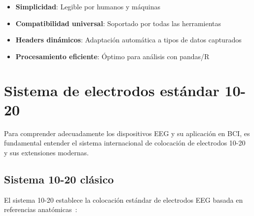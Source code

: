 \begin{itemize}
    \item \textbf{Simplicidad}: Legible por humanos y máquinas
    \item \textbf{Compatibilidad universal}: Soportado por todas las herramientas
    \item \textbf{Headers dinámicos}: Adaptación automática a tipos de datos capturados
    \item \textbf{Procesamiento eficiente}: Óptimo para análisis con pandas/R
\end{itemize}

\section{Sistema de electrodos estándar 10-20}
\label{sec:sistema_electrodos}

Para comprender adecuadamente los dispositivos EEG y su aplicación en BCI, es fundamental entender el sistema internacional de colocación de electrodos 10-20~\cite{system_10_20} y sus extensiones modernas.

\subsection{Sistema 10-20 clásico}
\label{subsec:sistema_10_20}

El sistema 10-20 establece la colocación estándar de electrodos EEG basada en referencias anatómicas~\cite{jasper1958report,klem1999ten}:

